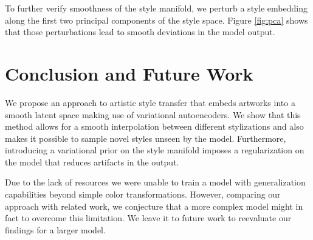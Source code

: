 \documentclass[10pt,twocolumn,letterpaper]{article}
\begin{document}
To further verify smoothness of the style manifold, we perturb a style embedding along the first two principal components of the style space. Figure \ref{fig:pca} shows that those perturbations lead to smooth deviations in the model output.

\section{Conclusion and Future Work}

We propose an approach to artistic style transfer that embeds artworks into a smooth latent space making use of variational autoencoders. We show that this method allows for a smooth interpolation between different stylizations and also makes it possible to sample novel styles unseen by the model. Furthermore, introducing a variational prior on the style manifold imposes a regularization on the model that reduces artifacts in the output. 

Due to the lack of resources we were unable to train a model with generalization capabilities beyond simple color transformations. However, comparing our approach with related work, we conjecture that a more complex model might in fact to overcome this limitation. We leave it to future work to reevaluate our findings for a larger model.

{\small


}
\end{document}

